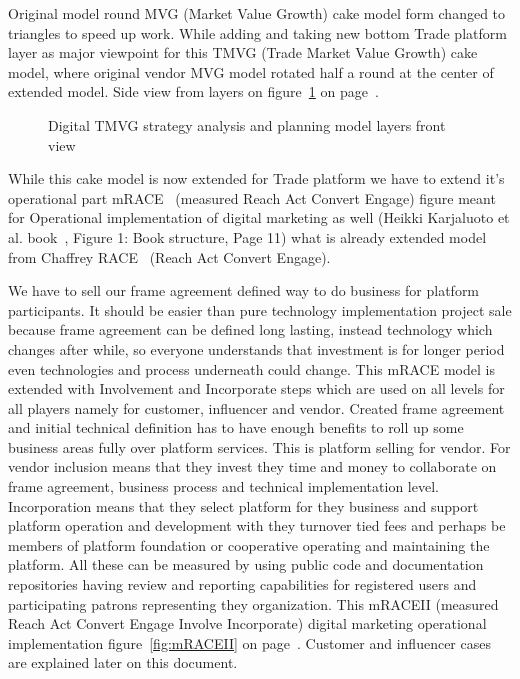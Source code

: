 Original model round MVG (Market Value Growth) cake model form changed to
triangles to speed up work. While adding and taking new bottom Trade platform
layer as major viewpoint for this TMVG (Trade Market Value Growth) cake model,
where original vendor MVG model rotated half a round at the center of extended
model. Side view from layers on figure~\ref{fig:TradeMarketValueGrowthLayers}
on page~\pageref{fig:TradeMarketValueGrowthLayers}.
\begin{figure}\begin{center}
 \caption{Digital TMVG strategy analysis and planning model layers front view}
 \label{fig:TradeMarketValueGrowthLayers}
\end{center}\end{figure}
While this cake model is now extended for Trade platform we have to extend
it's operational part mRACE~\cite{SDM2022} (measured Reach Act Convert Engage)
figure meant for Operational implementation of digital marketing as well
(Heikki Karjaluoto et al. book~\cite{Karjaluoto2022}, Figure 1: Book
structure, Page 11) what is already extended model from Chaffrey RACE~\cite{
ChaffreyRACE} (Reach Act Convert Engage).

We have to sell our frame agreement defined way to do business for platform
participants. It should be easier than pure technology implementation project
sale because frame agreement can be defined long lasting, instead technology
which changes after while, so everyone understands that investment is for
longer period even technologies and process underneath could change. This
mRACE model is extended with Involvement and Incorporate steps which are used
on all levels for all players namely for customer, influencer and vendor.
Created frame agreement and initial technical definition has to have enough
benefits to roll up some business areas fully over platform services. This is
platform selling for vendor. For vendor inclusion means that they invest they
time and money to collaborate on frame agreement, business process and
technical implementation level. Incorporation means that they select platform
for they business and support platform operation and development with they
turnover tied fees and perhaps be members of platform foundation or
cooperative operating and maintaining the platform. All these can be measured
by using public code and documentation repositories having review and
reporting capabilities for registered users and participating patrons
representing they organization. This mRACEII (measured Reach Act Convert
Engage Involve Incorporate) digital marketing operational implementation
figure~\ref{fig:mRACEII} on page~\pageref{fig:mRACEII}. Customer and
influencer cases are explained later on this document.

